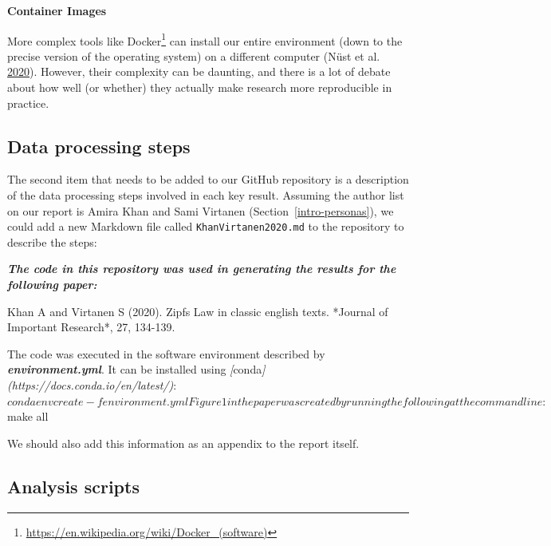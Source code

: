 \documentclass[
]{krantz}
\makeatletter
\newenvironment{Shaded}{\begin{snugshade}}{\end{snugshade}}
\newcommand{\AnnotationTok}[1]{\textcolor[rgb]{0.56,0.35,0.01}{\textbf{\textit{#1}}}}
\newcommand{\CommentTok}[1]{\textcolor[rgb]{0.56,0.35,0.01}{\textit{#1}}}
\newcommand{\InformationTok}[1]{\textcolor[rgb]{0.56,0.35,0.01}{\textbf{\textit{#1}}}}
\newcommand{\NormalTok}[1]{#1}
\newcommand{\OtherTok}[1]{\textcolor[rgb]{0.56,0.35,0.01}{#1}}
\renewenvironment{quote}{\begin{VF}}{\end{VF}}
\renewcommand{\href}[2]{#2\footnote{\url{#1}}}
\newenvironment{kframe}{%
\medskip{}
\setlength{\fboxsep}{.8em}
 \def\at@end@of@kframe{}%
 \ifinner\ifhmode%
  \def\at@end@of@kframe{\end{minipage}}%
  \begin{minipage}{\columnwidth}%
 \fi\fi%
 \def\FrameCommand##1{\hskip\@totalleftmargin \hskip-\fboxsep
 \colorbox{shadecolor}{##1}\hskip-\fboxsep
     \hskip-\linewidth \hskip-\@totalleftmargin \hskip\columnwidth}%
 \MakeFramed {\advance\hsize-\width
   \@totalleftmargin\z@ \linewidth\hsize
   \@setminipage}}%
 {\par\unskip\endMakeFramed%
 \at@end@of@kframe}
\renewenvironment{Shaded}{\begin{kframe}}{\end{kframe}}
\makeatother
\begin{document}
\begin{quote}
\textbf{Container Images}

More complex tools like \href{https://en.wikipedia.org/wiki/Docker_(software)}{Docker}
can install our entire environment
(down to the precise version of the operating system)
on a different computer (Nüst et al. \protect\hyperlink{ref-Nust2020}{2020}).
However,
their complexity can be daunting,
and there is a lot of debate
about how well (or whether) they actually make research more reproducible in practice.
\end{quote}

\hypertarget{provenance-code-steps}{%
\subsection{Data processing steps}\label{provenance-code-steps}}

The second item that needs to be added to our GitHub repository is a description
of the data processing steps involved in each key result.
Assuming the author list on our report is Amira Khan and Sami Virtanen (Section~\ref{intro-personas}),
we could add a new Markdown file called \texttt{KhanVirtanen2020.md} to the repository
to describe the steps:

\begin{Shaded}
\begin{Highlighting}[]
\AnnotationTok{The code in this repository was used in generating the results for the following paper:}

\NormalTok{Khan A and Virtanen S (2020). Zipf\textquotesingle{}s Law in classic english texts.}
\NormalTok{*Journal of Important Research*, 27, 134{-}139. }

\NormalTok{The code was executed in the software environment described by }\InformationTok{\textasciigrave{}environment.yml\textasciigrave{}}\NormalTok{.}
\NormalTok{It can be installed using }\CommentTok{[}\OtherTok{conda}\CommentTok{](https://docs.conda.io/en/latest/)}\NormalTok{:}
\NormalTok{$ conda env create {-}f environment.yml}

\NormalTok{Figure 1 in the paper was created by running the following at the command line:}
\NormalTok{$ make all}
\end{Highlighting}
\end{Shaded}

We should also add this information as an appendix to the report itself.

\hypertarget{provenance-code-scripts}{%
\subsection{Analysis scripts}\label{provenance-code-scripts}}
\end{document}
